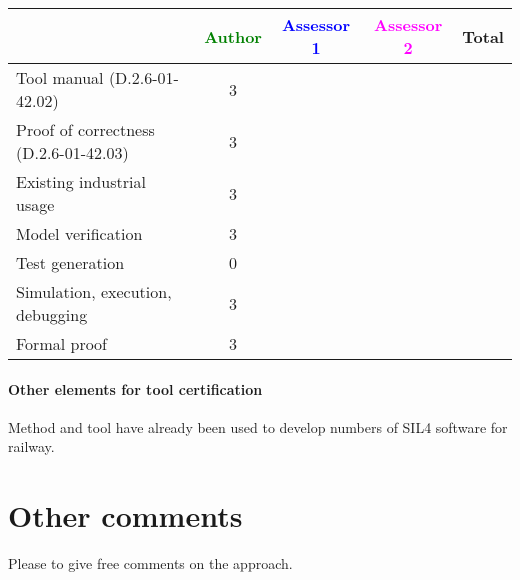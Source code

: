\begin{tabular}{|l | c | c | c | c|}
\hline
& \textcolor{green}{Author} & \textcolor{blue}{Assessor 1} & \textcolor{magenta}{Assessor 2} & Total \\
\hline 
Tool manual (D.2.6-01-42.02) & 3 & & &  \\
\hline
Proof of correctness (D.2.6-01-42.03)   & 3 & & & \\
\hline
Existing industrial  usage  & 3  & & & \\
\hline
Model verification & 3 & & & \\
\hline
Test generation & 0 & & & \\
\hline
Simulation, execution, debugging & 3 & & & \\
\hline
Formal proof & 3 & & & \\
\hline
\end{tabular}

\paragraph{Other elements for tool certification}


\begin{author_comment}
Method and tool have already been used to  develop numbers of  SIL4 software for railway.
\end{author_comment}


\section{Other comments}
Please to  give free comments on the approach.



